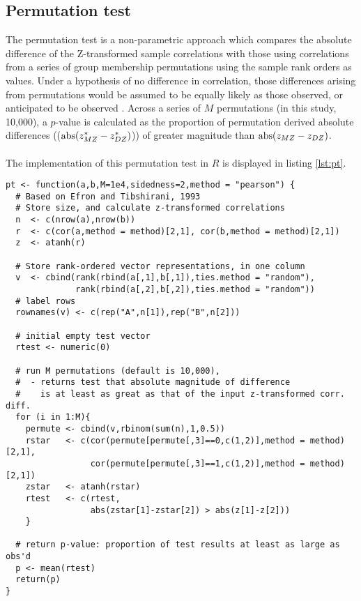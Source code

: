 \subsection{Permutation test}
The permutation test is a non-parametric approach which compares the absolute 
difference of the Z-transformed sample correlations with those using correlations 
from a series of group membership permutations using the sample rank orders as 
values.  Under a hypothesis of no difference in correlation, those differences arising from permutations would be assumed to be equally likely as those observed, or anticipated to be observed \cite{Efron1993}.  Across a series of $M$ permutations (in this study, 10,000), a $p$-value is calculated as the proportion of permutation derived absolute differences (($\operatorname{abs}(z_{MZ}^* - z_{DZ}^*)$)) of greater magnitude than $\operatorname{abs}(z_{MZ} - z_{DZ})$.
\\
\\
The implementation of this permutation test in $R$ is displayed in listing \ref{lst:pt}.

\begin{lstlisting}[float=h,caption={Permutation test},label={lst:pt}]
pt <- function(a,b,M=1e4,sidedness=2,method = "pearson") {
  # Based on Efron and Tibshirani, 1993
  # Store size, and calculate z-transformed correlations
  n  <- c(nrow(a),nrow(b))
  r  <- c(cor(a,method = method)[2,1], cor(b,method = method)[2,1])
  z  <- atanh(r)
  
  # Store rank-ordered vector representations, in one column
  v  <- cbind(rank(rbind(a[,1],b[,1]),ties.method = "random"),
              rank(rbind(a[,2],b[,2]),ties.method = "random"))
  # label rows
  rownames(v) <- c(rep("A",n[1]),rep("B",n[2]))
  
  # initial empty test vector
  rtest <- numeric(0)
  
  # run M permutations (default is 10,000),
  #  - returns test that absolute magnitude of difference
  #    is at least as great as that of the input z-transformed corr. diff.
  for (i in 1:M){
    permute <- cbind(v,rbinom(sum(n),1,0.5))
    rstar   <- c(cor(permute[permute[,3]==0,c(1,2)],method = method)[2,1],
                 cor(permute[permute[,3]==1,c(1,2)],method = method)[2,1])
    zstar   <- atanh(rstar)
    rtest   <- c(rtest,
                 abs(zstar[1]-zstar[2]) > abs(z[1]-z[2]))
    } 
  
  # return p-value: proportion of test results at least as large as obs'd
  p <- mean(rtest)
  return(p)
}
\end{lstlisting}

